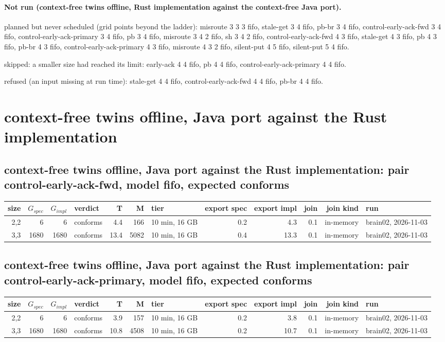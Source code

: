 \documentclass[10pt]{article}
\begin{document}
\paragraph{Not run (context-free twins offline, Rust implementation against the context-free Java port).}
planned but never scheduled (grid points beyond the ladder): misroute 3 3 3 fifo, stale-get 3 4 fifo, pb-br 3 4 fifo, control-early-ack-fwd 3 4 fifo, control-early-ack-primary 3 4 fifo, pb 3 4 fifo, misroute 3 4 2 fifo, sh 3 4 2 fifo, control-early-ack-fwd 4 3 fifo, stale-get 4 3 fifo, pb 4 3 fifo, pb-br 4 3 fifo, control-early-ack-primary 4 3 fifo, misroute 4 3 2 fifo, silent-put 4 5 fifo, silent-put 5 4 fifo.\par
skipped: a smaller size had reached its limit: early-ack 4 4 fifo, pb 4 4 fifo, control-early-ack-primary 4 4 fifo.\par
refused (an input missing at run time): stale-get 4 4 fifo, control-early-ack-fwd 4 4 fifo, pb-br 4 4 fifo.\par
\section*{context-free twins offline, Java port against the Rust implementation}
\subsection*{context-free twins offline, Java port against the Rust implementation: pair \textsf{control-early-ack-fwd}, model fifo, expected conforms}
\begin{longtable}{@{}rrrlrrlrrrrl@{}}
\toprule
size & $G_{\mathit{spec}}$ & $G_{\mathit{impl}}$ & verdict & T & M & tier & export spec & export impl & join & join kind & run \\
\midrule
\endhead
\color{red} 2,2 & 6 & 6 & conforms & 4.4 & 166 & 10 min, 16 GB & 0.2 & 4.3 & 0.1 & in-memory & brain02, 2026-11-03 \\
\color{red} 3,3 & 1680 & 1680 & conforms & 13.4 & 5082 & 10 min, 16 GB & 0.4 & 13.3 & 0.1 & in-memory & brain02, 2026-11-03 \\
\bottomrule
\end{longtable}
\subsection*{context-free twins offline, Java port against the Rust implementation: pair \textsf{control-early-ack-primary}, model fifo, expected conforms}
\begin{longtable}{@{}rrrlrrlrrrrl@{}}
\toprule
size & $G_{\mathit{spec}}$ & $G_{\mathit{impl}}$ & verdict & T & M & tier & export spec & export impl & join & join kind & run \\
\midrule
\endhead
\color{red} 2,2 & 6 & 6 & conforms & 3.9 & 157 & 10 min, 16 GB & 0.2 & 3.8 & 0.1 & in-memory & brain02, 2026-11-03 \\
\color{red} 3,3 & 1680 & 1680 & conforms & 10.8 & 4508 & 10 min, 16 GB & 0.2 & 10.7 & 0.1 & in-memory & brain02, 2026-11-03 \\
\bottomrule
\end{longtable}
\end{document}
